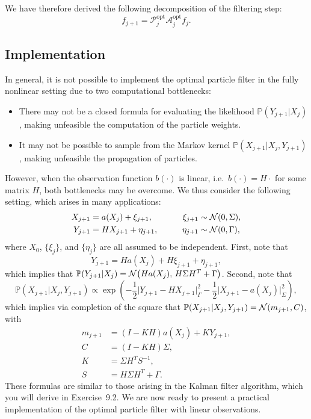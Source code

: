 We have therefore derived the following decomposition of the filtering step:
\begin{equation}
  \label{eq:9.7}
  f_{j+1} = \mathcal{P}_j^{\mathrm{opt}} \mathcal{A}_j^{\mathrm{opt}} f_j.
\end{equation}

\subsection{Implementation}
\label{sec:9.3.2}

In general, it is not possible to implement the optimal particle filter in the fully
nonlinear setting due to two computational bottlenecks:

\begin{itemize}
  \item There may not be a closed formula for evaluating the likelihood
    $\mathbb{P}(Y_{j+1} | X_j)$, making unfeasible the computation of the particle
    weights.

  \item It may not be possible to sample from the Markov kernel
    $\mathbb{P}(X_{j+1} | X_j, Y_{j+1})$, making unfeasible the propagation of
    particles.
\end{itemize}

However, when the observation function $b(\cdot)$ is linear, i.e.\ $b(\cdot) = H\cdot$
for some matrix $H$, both bottlenecks may be overcome. We thus consider the following
setting, which arises in many applications:
\begin{alignat*}{3}
  X_{j+1} &= a(X_j) + \xi_{j+1}, &\qquad \xi_{j+1} &\sim \mathcal{N}(0, \Sigma), \\
  Y_{j+1} &= HX_{j+1} + \eta_{j+1}, &\qquad \eta_{j+1} &\sim \mathcal{N}(0, \Gamma),
\end{alignat*}
where $X_0$, $\{\xi_j\}$, and $\{\eta_j\}$ are all assumed to be independent. First,
note that
\[
  Y_{j+1} = Ha(X_j) + H\xi_{j+1} + \eta_{j+1},
\]
which implies that $\mathbb{P}(Y_{j+1} | X_j) = \mathcal{N}\!\left(Ha(X_j),\,
H\Sigma H^T + \Gamma\right)$. Second, note that
\[
  \mathbb{P}(X_{j+1} | X_j, Y_{j+1})
  \propto \exp\!\left(
    -\frac{1}{2}\bigl|Y_{j+1} - HX_{j+1}\bigr|_\Gamma^2
    - \frac{1}{2}\bigl|X_{j+1} - a(X_j)\bigr|_\Sigma^2
  \right),
\]
which implies via completion of the square that $\mathbb{P}(X_{j+1} | X_j, Y_{j+1}) =
\mathcal{N}(m_{j+1}, C)$, with
\begin{align*}
  m_{j+1} &= (I - KH)a(X_j) + KY_{j+1}, \\
  C &= (I - KH)\Sigma, \\
  K &= \Sigma H^T S^{-1}, \\
  S &= H\Sigma H^T + \Gamma.
\end{align*}
These formulas are similar to those arising in the Kalman filter algorithm, which you will
derive in Exercise~9.2. We are now ready to present a practical implementation of the
optimal particle filter with linear observations.

